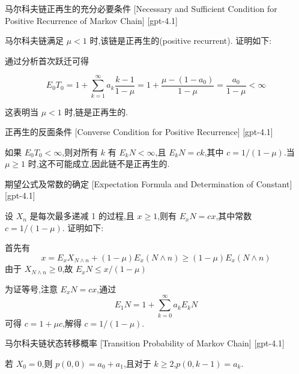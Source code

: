 \documentclass[UTF8]{ctexart}
\begin{document}
    
    
    \begin{thm}
        {马尔科夫链正再生的充分必要条件}
        [Necessary and Sufficient Condition for Positive Recurrence of Markov Chain]
        [gpt-4.1]
        
马尔科夫链满足 $\mu < 1$ 时,该链是正再生的(positive recurrent).
证明如下:

通过分析首次跃迁可得

\[
E_{0} T_{0} = 1 + \sum_{k = 1}^{\infty} a_{k} \frac{k - 1}{1 - \mu} = 1 + \frac{\mu - (1 - a_{0})}{1 - \mu} = \frac{a_{0}}{1 - \mu} < \infty
\]

这表明当 $\mu < 1$ 时,链是正再生的.

    \end{thm}
    
    
    
    \begin{crl}
        {正再生的反面条件}
        [Converse Condition for Positive Recurrence]
        [gpt-4.1]
        
如果 $E_{0} T_{0} < \infty$,则对所有 $k$ 有 $E_{k} N < \infty$,且 $E_{k} N = c k$,其中 $c = 1/(1 - \mu)$.当 $\mu \geq 1$ 时,这不可能成立,因此链不是正再生的.

    \end{crl}
    
    
    
    \begin{thm}
        {期望公式及常数的确定}
        [Expectation Formula and Determination of Constant]
        [gpt-4.1]
        
设 $X_n$ 是每次最多递减 1 的过程,且 $x \geq 1$,则有 $E_x N = c x$,其中常数 $c = 1/(1 - \mu)$.
证明如下:

首先有
\[
x = E_x X_{N \wedge n} + (1 - \mu) E_x (N \wedge n) \geq (1 - \mu) E_x (N \wedge n)
\]
由于 $X_{N \wedge n} \geq 0$,故 $E_x N \leq x/(1 - \mu)$

为证等号,注意 $E_x N = c x$,通过
\[
E_1 N = 1 + \sum_{k = 0}^{\infty} a_k E_k N
\]
可得 $c = 1 + \mu c$,解得 $c = 1/(1 - \mu)$.

    \end{thm}
    
    
    
    \begin{dfn}
        {马尔科夫链状态转移概率}
        [Transition Probability of Markov Chain]
        [gpt-4.1]
        
若 $X_0 = 0$,则 $p(0, 0) = a_0 + a_1$,且对于 $k \geq 2$,$p(0, k-1) = a_k$.

    \end{dfn}
    
\end{document}
